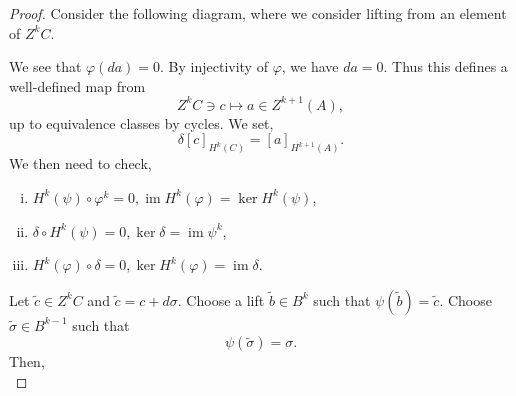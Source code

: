\documentclass[8pt]{article}
\DeclareMathOperator{\image}{im}
\begin{document}
\begin{proof}
  Consider the following diagram, where we consider lifting from an element of $Z^kC$. 
  \begin{center}
  \end{center}
  We see that $\varphi(da) = 0$. By injectivity of $\varphi$, we have $da=0$. Thus this defines a well-defined map from 
  \begin{equation*}
    Z^kC\ni c\mapsto a\in Z^{k+1}(A),
  \end{equation*}
  up to equivalence classes by cycles. We set,
  \begin{equation*}
    \delta[c]_{H^k(C)} = [a]_{H^{k+1}(A)}.
  \end{equation*}
  We then need to check,
  \begin{enumerate}[i).]
    \item $H^k(\psi)\circ\varphi^k = 0,\image H^k(\varphi)=\ker H^k(\psi)$,
    \item $\delta\circ H^k(\psi) = 0,\ker\delta=\image\psi^k$,
    \item $H^k(\varphi)\circ\delta = 0,\ker H^k(\varphi)=\image \delta$.
  \end{enumerate}
  Let $\tilde{c}\in Z^kC$ and $\tilde{c}=c+d\sigma$. Choose a lift $\tilde{b}\in B^k$ such that $\psi(\tilde{b})=\tilde{c}$. Choose $\tilde{\sigma}\in B^{k-1}$ such that 
  \begin{equation*}
    \psi(\tilde{\sigma}) = \sigma.
  \end{equation*}
  Then,
  \begin{equation*}

\end{equation*}
\end{proof}
\end{document}
